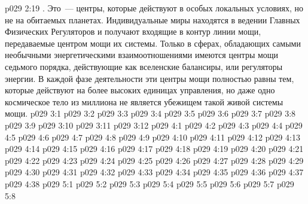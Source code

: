 \vs p029 2:19 . Это~--- центры, которые действуют в особых локальных условиях, но не на обитаемых планетах. Индивидуальные миры находятся в ведении Главных Физических Регуляторов и получают входящие в контур линии мощи, передаваемые центром мощи их системы. Только в сферах, обладающих самыми необычными энергетическими взаимоотношениями имеются центры мощи седьмого порядка, действующие как вселенские балансиры, или регуляторы энергии. В каждой фазе деятельности эти центры мощи полностью равны тем, которые действуют на более высоких единицах управления, но даже одно космическое тело из миллиона не является убежищем такой живой системы мощи.
\vs p029 3:1 
\vs p029 3:2 
\vs p029 3:3 
\vs p029 3:4 \pc 
\vs p029 3:5 
\vs p029 3:6 \pc 
\vs p029 3:7 
\vs p029 3:8 
\vs p029 3:9 \pc 
\vs p029 3:10 \pc 
\vs p029 3:11 
\vs p029 3:12 
\vs p029 4:1 
\vs p029 4:2 
\vs p029 4:3 
\vs p029 4:4 \pc 
\vs p029 4:5 
\vs p029 4:6 
\vs p029 4:7 
\vs p029 4:8 
\vs p029 4:9 
\vs p029 4:10 
\vs p029 4:11 
\vs p029 4:12 \pc 
\vs p029 4:13 
\vs p029 4:14 
\vs p029 4:15 
\vs p029 4:16 
\vs p029 4:17 
\vs p029 4:18 
\vs p029 4:19 
\vs p029 4:20 
\vs p029 4:21 
\vs p029 4:22 
\vs p029 4:23 
\vs p029 4:24 
\vs p029 4:25 
\vs p029 4:26 \pc 
\vs p029 4:27 
\vs p029 4:28 
\vs p029 4:29 
\vs p029 4:30 
\vs p029 4:31 
\vs p029 4:32 
\vs p029 4:33 
\vs p029 4:34 
\vs p029 4:35 
\vs p029 4:36 
\vs p029 4:37 
\vs p029 4:38 
\vs p029 5:1 
\vs p029 5:2 
\vs p029 5:3 
\vs p029 5:4 \pc 
\vs p029 5:5 \pc 
\vs p029 5:6 
\vs p029 5:7 
\vsetoff
\vs p029 5:8 
\quizlink

